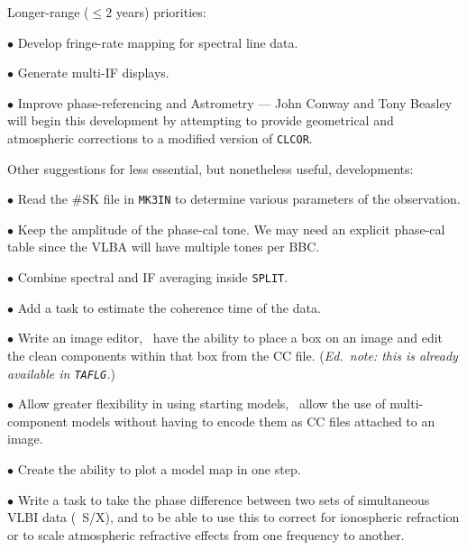 Longer-range ($\leq 2$ years) priorities:
\begin{description}
\item{$\bullet$} Develop fringe-rate mapping for spectral line data.

\item{$\bullet$} Generate multi-IF displays.

\item{$\bullet$} Improve phase-referencing and Astrometry --- John
Conway and Tony Beasley will begin this development by attempting to
provide geometrical and atmospheric corrections to a modified version
of {\tt CLCOR}.
\end{description}

Other suggestions for less essential, but nonetheless useful,
developments:
\begin{description}
\item{$\bullet$} Read the \#SK file in {\tt MK3IN} to determine
various parameters of the observation.

\item{$\bullet$} Keep the amplitude of the phase-cal tone. We may need
an explicit phase-cal table since the VLBA will have multiple tones
per BBC.

\item{$\bullet$} Combine spectral and IF averaging inside {\tt SPLIT}.

\item{$\bullet$} Add a task to estimate the coherence time of the
data.

\item{$\bullet$} Write an image editor, \ie\ have the ability to place
a box on an image and edit the clean components within that box from
the CC file.  ({\it Ed.~note: this is already available in {\tt TAFLG}.})

\item{$\bullet$} Allow greater flexibility in using starting models,
\eg\ allow the use of multi-component models without having to encode
them as CC files attached to an image.

\item{$\bullet$} Create the ability to plot a model map in one step.

\item{$\bullet$} Write a task to take the phase difference between two
sets of simultaneous VLBI data (\eg\ S/X), and to be able to use this
to correct for ionospheric refraction or to scale atmospheric
refractive effects from one frequency to another.

\end{description}

